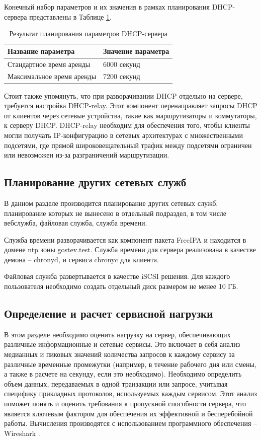 \documentclass[14pt, a4paper]{extarticle}
\numberwithin{equation}{section}
\begin{document}
Конечный набор параметров и их значения в рамках планирования
DHCP-сервера представлены в Таблице \ref{table:dhcp_plan_parameters}.

\begin{table}[H]
\centering
\small
\caption{Результат планирования параметров DHCP-сервера}
\label{table:dhcp_plan_parameters}
\begin{tabular}{|l|l|}
\hline
\textbf{Название параметра} & \textbf{Значение параметра} \\
\hline
Стандартное время аренды & 6000 секунд \\
\hline
Максимальное время аренды & 7200 секунд \\
\hline
\end{tabular}
\end{table}

Стоит также упомянуть, что при разворачивании DHCP отдельно на сервере, требуется настройка DHCP-relay. 
Этот компонент перенаправляет запросы DHCP от клиентов через сетевые устройства, 
такие как маршрутизаторы и коммутаторы, к серверу DHCP. DHCP-relay необходим для 
обеспечения того, чтобы клиенты могли получать IP-конфигурацию в сетевых 
архитектурах с множественными подсетями, где прямой широковещательный трафик между 
подсетями ограничен или невозможен из-за разграничений маршрутизации.





\subsection{Планирование других сетевых служб}
В данном разделе производится планирование других сетевых служб, 
планирование которых не вынесено в отдельный подраздел, в 
том числе вебслужба, файловая служба, служба времени. 

Служба времени разворачивается как компонент пакета FreeIPA и находится в домене
ntp зоны gostev.test. Служба времени для сервера реализована в качестве демона -- chronyd, и
сервиса chronyc для клиента.

Файловая служба развертывается в качестве iSCSI решения. Для каждого пользователя необходимо
создать отдельный диск размером не менее 10 ГБ.


\subsection{Определение и расчет сервисной нагрузки}
В этом разделе необходимо оценить нагрузку на сервер, обеспечивающих различные информационные и сетевые сервисы. 
Это включает в себя анализ медианных и пиковых значений количества запросов к каждому сервису за различные временные промежутки 
(например, в течение рабочего дня или смены, а также в расчете на секунду, если это необходимо). 
Необходимо определить объем данных, передаваемых в одной транзакции или запросе, 
учитывая специфику прикладных протоколов, используемых каждым сервисом. 
Этот анализ поможет понять и оценить требования к пропускной способности сервера, 
что является ключевым фактором для обеспечения их эффективной и бесперебойной работы.
Вычисления производятся с использованием программного обеспечения -- Wireshark \cite{habrp-wireshark}.
\end{document}
